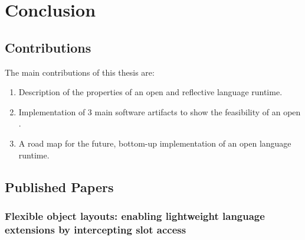 
\chapter{Conclusion}
\minitoc

\section{Contributions}
The main contributions of this thesis are:
\begin{enumerate}
	\item Description of the properties of an open and reflective language runtime.
	\item Implementation of 3 main software artifacts to show the feasibility of an open \VM.
	\item A road map for the future, bottom-up implementation of an open language runtime.
\end{enumerate}


\section{Published Papers}
\subsection{Flexible object layouts: enabling lightweight language extensions by intercepting slot access}

